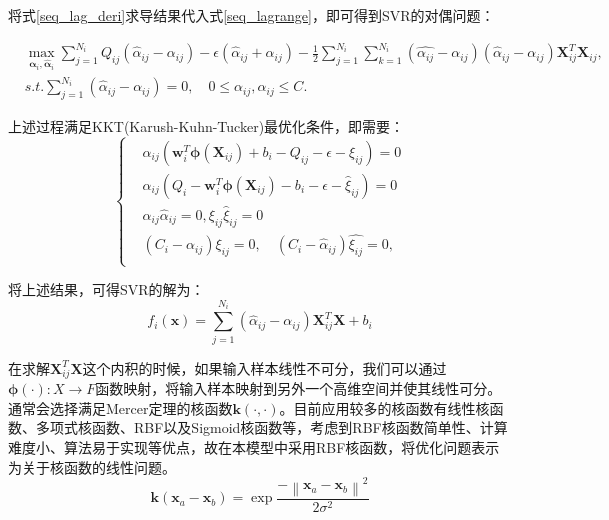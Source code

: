 将式\eqref{seq_lag_deri}求导结果代入式\eqref{seq_lagrange}，即可得到SVR的对偶问题：

\begin{equation}\label{seq_lagr_dual}
\begin{split}
&\max_{\bm{\alpha}_{i}, \bm{\hat{\alpha}}_{i}} \sum_{j=1}^{N_{i}} Q_{ij}(\hat{\alpha}_{ij} - \alpha_{ij}) - \epsilon (\hat{\alpha}_{ij} + \alpha_{ij}) - \frac{1}{2} \sum_{j=1}^{N_{i}} \sum_{k=1}^{N_{i}}(\hat{\alpha_{ij}}-\alpha_{ij})(\hat{\alpha}_{ij}-\alpha_{ij})\bm{X}_{ij}^{T}\bm{X}_{ij},\\
&s.t. \sum_{j=1}^{N_{i}}(\hat{\alpha}_{ij}-\alpha_{ij})=0, \quad 0 \leqslant \alpha_{ij},\hat{\alpha}_{ij} \leqslant C.
\end{split}
\end{equation}

上述过程满足KKT(Karush-Kuhn-Tucker)最优化条件，即需要：
\begin{equation}
\label{seq_kkt}
\left\{\begin{matrix}
&\alpha_{ij}(\bm{w}_{i}^{T} \bm{\phi}(\bm{X}_{ij}) + b_{i} - Q_{ij} - \epsilon - \xi_{ij})=0
\\ 
&\hat{\alpha}_{ij}(Q_{i} - \bm{w}_{i}^{T} \bm{\phi}(\bm{X}_{ij}) - b_{i} - \epsilon - \hat{\xi}_{ij})=0
\\ 
&\alpha_{ij}\hat{\alpha}_{ij}=0, \xi_{ij}\hat{\xi}_{ij}=0
\\ 
&(C_{i}-\alpha_{ij})\xi_{ij}=0,\quad (C_{i}-\hat{\alpha}_{ij})\hat{\xi_{ij}}=0,
\\
\end{matrix}\right.
\end{equation}

将上述结果，可得SVR的解为：
\begin{equation}
\label{seq_svr_final}
f_{i}(\bm{x})=\sum_{j=1}^{N_{i}}(\hat{\alpha}_{ij}-\alpha_{ij})\bm{X}_{ij}^{T}\bm{X}+b_{i}
\end{equation}

在求解$\bm{X}_{ij}^{T}\bm{X}$这个内积的时候，如果输入样本线性不可分，我们可以通过$\bm{\phi}(\cdot):X \to F$函数映射，将输入样本映射到另外一个高维空间并使其线性可分。通常会选择满足Mercer定理的核函数$\bm{k}(\cdot,\cdot)$。目前应用较多的核函数有线性核函数、多项式核函数、RBF以及Sigmoid核函数等，考虑到RBF核函数简单性、计算难度小、算法易于实现等优点，故在本模型中采用RBF核函数，将优化问题表示为关于核函数的线性问题。
\begin{equation}
\bm{k}(\bm{x}_{a} - \bm{x}_{b}) = \exp{\frac{-\left \| \bm{x}_{a} - \bm{x}_{b} \right \|^{2}}{2\sigma^{2}}}
\end{equation}


